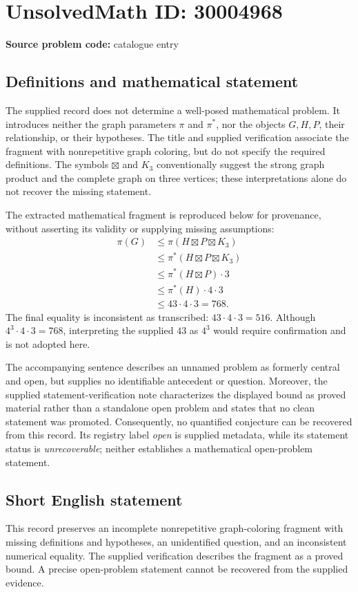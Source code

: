\documentclass[11pt]{article}
\begin{document}
\section*{UnsolvedMath ID: 30004968}
\textbf{Source problem code:} catalogue entry
\subsection{Definitions and mathematical statement}
The supplied record does not determine a well-posed mathematical problem. It introduces neither the graph parameters \(\pi\) and \(\pi^{*}\), nor the objects \(G,H,P\), their relationship, or their hypotheses. The title and supplied verification associate the fragment with nonrepetitive graph coloring, but do not specify the required definitions. The symbols \(\boxtimes\) and \(K_3\) conventionally suggest the strong graph product and the complete graph on three vertices; these interpretations alone do not recover the missing statement.

The extracted mathematical fragment is reproduced below for provenance, without asserting its validity or supplying missing assumptions:
\[
\begin{aligned}
\pi(G)
&\leq \pi(H\boxtimes P\boxtimes K_3)\\
&\leq \pi^{*}(H\boxtimes P\boxtimes K_3)\\
&\leq \pi^{*}(H\boxtimes P)\cdot 3\\
&\leq \pi^{*}(H)\cdot 4\cdot 3\\
&\leq 43\cdot 4\cdot 3=768.
\end{aligned}
\]
The final equality is inconsistent as transcribed: \(43\cdot4\cdot3=516\). Although \(4^{3}\cdot4\cdot3=768\), interpreting the supplied \(43\) as \(4^{3}\) would require confirmation and is not adopted here.

The accompanying sentence describes an unnamed problem as formerly central and open, but supplies no identifiable antecedent or question. Moreover, the supplied statement-verification note characterizes the displayed bound as proved material rather than a standalone open problem and states that no clean statement was promoted. Consequently, no quantified conjecture can be recovered from this record. Its registry label \emph{open} is supplied metadata, while its statement status is \emph{unrecoverable}; neither establishes a mathematical open-problem statement.
\subsection{Short English statement}
This record preserves an incomplete nonrepetitive graph-coloring fragment with missing definitions and hypotheses, an unidentified question, and an inconsistent numerical equality. The supplied verification describes the fragment as a proved bound. A precise open-problem statement cannot be recovered from the supplied evidence.
\end{document}
